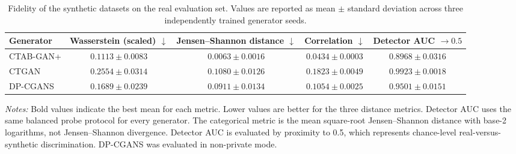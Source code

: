 \begin{table}[htbp]
    \centering
    \caption{Fidelity of the synthetic datasets on the real evaluation set.
    Values are reported as mean $\pm$ standard deviation across three
    independently trained generator seeds.}
    \label{tab:rq1_fidelity}
    \small
    \setlength{\tabcolsep}{5pt}
    \begin{tabular}{lcccc}
        \toprule
        Generator
            & Wasserstein (scaled) $\downarrow$
            & \shortstack{Jensen--Shannon\\distance $\downarrow$}
            & Correlation $\downarrow$
            & Detector AUC $\rightarrow 0.5$ \\
        \midrule
        CTAB-GAN+
            & $\mathbf{0.1113 \pm 0.0083}$
            & $\mathbf{0.0063 \pm 0.0016}$
            & $\mathbf{0.0434 \pm 0.0003}$
            & $\mathbf{0.8968 \pm 0.0316}$ \\
        CTGAN
            & $0.2554 \pm 0.0314$
            & $0.1080 \pm 0.0126$
            & $0.1823 \pm 0.0049$
            & $0.9923 \pm 0.0018$ \\
        DP-CGANS
            & $0.1689 \pm 0.0239$
            & $0.0911 \pm 0.0134$
            & $0.1054 \pm 0.0025$
            & $0.9501 \pm 0.0151$ \\
        \bottomrule
    \end{tabular}

    \vspace{2mm}
    \begin{minipage}{0.96\linewidth}
        \footnotesize
        \textit{Notes:} Bold values indicate the best mean for each metric.
        Lower values are better for the three distance metrics. Detector AUC
        uses the same balanced probe protocol for every generator. The
        categorical metric is the mean square-root Jensen--Shannon distance
        with base-2 logarithms, not Jensen--Shannon divergence. Detector AUC
        is evaluated by proximity to 0.5, which represents chance-level
        real-versus-synthetic discrimination. DP-CGANS was evaluated in
        non-private mode.
    \end{minipage}
\end{table}
